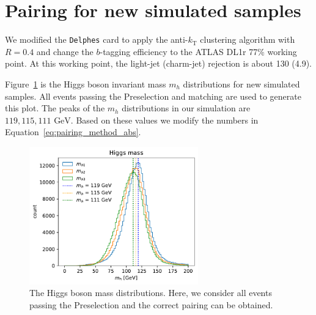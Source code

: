 \documentclass[12pt]{article}
\begin{document}
\section{Pairing for new simulated samples}%
\label{sec:pairing_for_new_simulated_samples}
    We modified the \verb|Delphes| card to apply the anti-$k_{\text{T}}$ clustering algorithm with $R = 0.4$ and change the $b$-tagging efficiency to the ATLAS DL1r 77\% working point. At this working point, the light-jet (charm-jet) rejection is about 130 (4.9).

    Figure~\ref{fig:mh_distribution_new} is the Higgs boson invariant mass $m_h$ distributions for new simulated samples. All events passing the Preselection and matching are used to generate this plot. The peaks of the $m_{h}$ distributions in our simulation are $119, 115, 111 \text{ GeV}$. Based on these values we modify the numbers in Equation~\ref{eq:pairing_method_abs}.
	\begin{figure}[htpb] 
		\centering
        \includegraphics[width=0.65\textwidth]{mh_distribution_new.pdf}
		\caption{The Higgs boson mass distributions. Here, we consider all events passing the Preselection and the correct pairing can be obtained.}
		\label{fig:mh_distribution_new}
	\end{figure}
\end{document}
